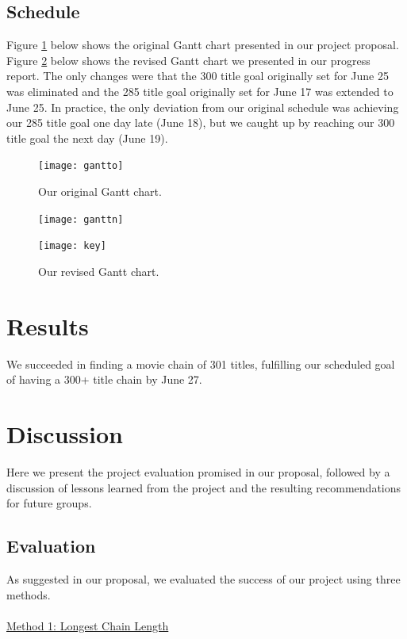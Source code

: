 \documentclass[11pt,english]{article}
\begin{document}
\subsection{Schedule}
Figure \ref{fig:gantto} below shows the original Gantt chart presented in
our project proposal. Figure \ref{fig:ganttn} below shows the revised Gantt
chart we presented in our progress report. The only changes were that the 300
title goal originally set for June 25 was eliminated and the 285 title goal
originally set for June 17 was extended to June 25. In practice, the only
deviation from our original schedule was achieving our 285 title goal one day
late (June 18), but we caught up by reaching our 300 title goal the next day
(June 19).
\begin{figure}[h]
\begin{center}
\texttt{[image: gantto]}
\end{center}
\vspace{-7mm}
\caption{Our original Gantt chart.}
\label{fig:gantto}
\end{figure}
\begin{figure}[h]
\begin{center}
\texttt{[image: ganttn]}
\end{center}
\vspace{-7mm}
\caption{Our revised Gantt chart.}
\label{fig:ganttn}
\texttt{[image: key]}
\end{figure}

\section{Results}
We succeeded in finding a movie chain of 301 titles, fulfilling our scheduled
goal of having a 300+ title chain by June 27.

\section{Discussion}
Here we present the project evaluation promised in our proposal, followed by
a discussion of lessons learned from the project and the resulting
recommendations for future groups.
\subsection{Evaluation}
As suggested in our proposal, we evaluated the success of our project using
three methods.\\\\
\underline{Method 1: Longest Chain Length}
\end{document}
